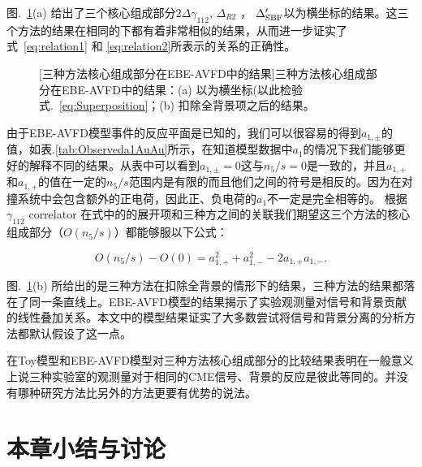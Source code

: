 图.~\ref{fig:AVFD_delta}(a) 给出了三个核心组成部分$2\Delta\gamma_{112}$, $\Delta_{R2}$ ， $\Delta'_{\rm SBF}$以\ns 为横坐标的结果。这三个方法的结果在相同的\ns 下都有着非常相似的结果，从而进一步证实了式~\ref{eq:relation1} 和 \ref{eq:relation2}所表示的关系的正确性。
\begin{figure}[bp]
\vspace*{-0.01in}
\centering
{}
[三种方法核心组成部分在EBE-AVFD中的结果]{三种方法核心组成部分在EBE-AVFD中的结果：(a) 以\ns 为横坐标(以此检验式.~\ref{eq:Superposition}；(b) 扣除全背景项之后的结果。} \label{fig:AVFD_delta}
\end{figure}
由于EBE-AVFD模型事件的反应平面是已知的，我们可以很容易的得到$a_{1,\pm}$的值，如表.\ref{tab:Observeda1AuAu}所示，在知道模型数据中$a_1$的情况下我们能够更好的解释不同\ns 的结果。从表中可以看到$a_{1,\pm} = 0$这与$n_{5}/s=0$是一致的，并且$a_{1,+}$和$a_{1,+}$的值在一定的$n_{5}/s$范围内是有限的而且他们之间的符号是相反的。因为在对撞系统中会包含额外的正电荷，因此正、负电荷的$a_{1}$不一定是完全相等的。
根据$\gamma_{112}$ correlator 在式中的的展开项和三种方之间的关联我们期望这三个方法的核心组成部分（$O(n_{5}/s)$）都能够服以下公式：
\begin{center}
\begin{equation}
O(n_{5}/s) - O(0) =  a_{1,+}^2 + a_{1,-}^2 - 2a_{1,+}a_{1,-}.
\label{eq:Superposition}
\end{equation}
\end{center}
图.~\ref{fig:AVFD_delta}(b) 所给出的是三种方法在扣除全背景的情形下的结果，三种方法的结果都落在了同一条直线上。EBE-AVFD模型的结果揭示了实验观测量对信号和背景贡献的线性叠加关系。本文中的模型结果证实了大多数尝试将信号和背景分离的分析方法都默认假设了这一点。

在Toy模型和EBE-AVFD模型对三种方法核心组成部分的比较结果表明在一般意义上说三种实验室的观测量对于相同的CME信号、背景的反应是彼此等同的。并没有哪种研究方法比另外的方法更要有优势的说法。




\section{本章小结与讨论}


